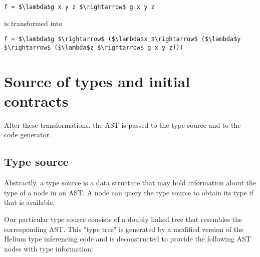 \documentclass[10pt]{report}
\begin{document}
\begin{lstlisting}[mathescape]
f = $\lambda$g x y z $\rightarrow$ g x y z
\end{lstlisting}

is transformed into

\begin{lstlisting}[caption=Result of lambda argument expansion transformation.,mathescape]
f = $\lambda$g $\rightarrow$ ($\lambda$x $\rightarrow$ ($\lambda$y $\rightarrow$ ($\lambda$z $\rightarrow$ g x y z)))
\end{lstlisting}

\section{Source of types and initial contracts}
\label{sourceoftypes}
After these transformations, the AST is passed to the type source and to the code generator.

\subsection{Type source}


Abstractly, a type source is a data structure that may hold information about the type of a node in an AST.
A node can query the type source to obtain its type if that is available.

Our particular type source consists of a doubly linked tree that resembles the corresponding AST.
This "type tree" is generated by a modified version of the Helium type inferencing code and is deconstructed to provide the following AST nodes with type information:
\end{document}
